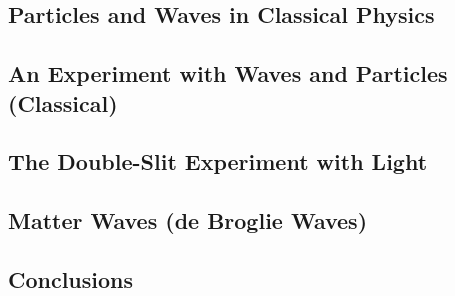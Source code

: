 \subsection{Particles and Waves in Classical Physics}

\subsection{An Experiment with Waves and Particles (Classical)}

\subsection{The Double-Slit Experiment with Light}

\subsection{Matter Waves (de Broglie Waves)}

\subsection{Conclusions}
